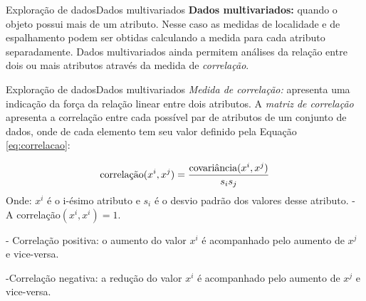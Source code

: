 \documentclass[t]{beamer}
\begin{document}

\begin{ftst}{Exploração de dados}{Dados multivariados}
\justifying
\textbf{Dados multivariados:} quando o objeto possui mais de um atributo.
\vone
Nesse caso as medidas de localidade e de espalhamento podem ser obtidas calculando a medida para cada atributo separadamente.
\vone
Dados multivariados ainda permitem análises da relação entre dois ou mais atributos através da medida de \textit{correlação}.

\end{ftst}


\begin{ftst}{Exploração de dados}{Dados multivariados}
\justifying
\textit{Medida de correlação:} apresenta uma indicação da força da relação linear entre dois atributos. 
\vone
A \textit{matriz de correlação} apresenta a correlação entre cada possível par de atributos de um conjunto de dados, onde de cada elemento tem seu valor definido pela Equação \ref{eq:correlacao}:

\begin{equation}
    \centering
    \text{correlação}(x^i,x^j) = \frac{\text{covariância}(x^i,x^j)}{s_i s_j}
    \label{eq:correlacao}
\end{equation}
\scriptsize
Onde: $x^i$ é o i-ésimo atributo e $s_i$ é o desvio padrão dos valores desse atributo.
\vone
\small
- A correlação$(x^i,x^i) = 1$.

- Correlação positiva: o aumento do valor $x^i$ é acompanhado pelo aumento de $x^j$ e vice-versa.

-Correlação negativa: a redução do valor $x^i$ é acompanhado pelo aumento de $x^j$ e vice-versa.

\end{ftst}

\end{document}
